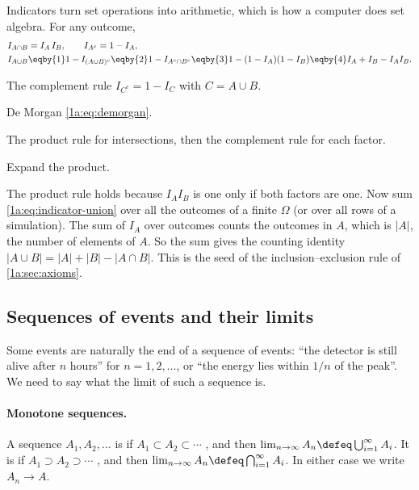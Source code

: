 Indicators turn set operations into arithmetic, which is how a computer does
set algebra. For any outcome,
\begin{align}
I_{A\cap B} &= I_A\,I_B, \qquad I_{A^c}=1-I_A, \nonumber\\
I_{A\cup B} &\eqby{1} 1-I_{(A\cup B)^c}
  \eqby{2} 1-I_{A^c\cap B^c}
  \eqby{3} 1-(1-I_A)(1-I_B)
  \eqby{4} I_A+I_B-I_AI_B . \label{1a:eq:indicator-union}
\end{align}
\begin{explain}
  \item The complement rule $I_{C^c}=1-I_C$ with $C=A\cup B$.
  \item De Morgan \eqref{1a:eq:demorgan}.
  \item The product rule for intersections, then the complement rule for each factor.
  \item Expand the product.
\end{explain}
The product rule holds because $I_AI_B$ is one only if both factors are one.
Now sum \eqref{1a:eq:indicator-union} over all the outcomes of a finite
$\Omega$ (or over all rows of a simulation). The sum of $I_A$ over outcomes
counts the outcomes in $A$, which is $|A|$, the number of elements of $A$. So
the sum gives the counting identity $|A\cup B|=|A|+|B|-|A\cap B|$. This is the
seed of the inclusion--exclusion rule of \cref{1a:sec:axioms}.

\subsection{Sequences of events and their limits}

Some events are naturally the end of a sequence of events: ``the detector is
still alive after $n$ hours'' for $n=1,2,\dots$, or ``the energy lies within
$1/n$ of the peak''. We need to say what the limit of such a sequence is.

\paragraph{Monotone sequences.}
A sequence $A_1,A_2,\dots$ is  if
$A_1\subset A_2\subset\cdots$ , and then $\lim_{n\to\infty}A_n\defeq\bigcup_{i=1}^\infty A_i$. It is
 if $A_1\supset A_2\supset\cdots$
, and then
$\lim_{n\to\infty}A_n\defeq\bigcap_{i=1}^\infty A_i$. In either case we write
$A_n\to A$.

